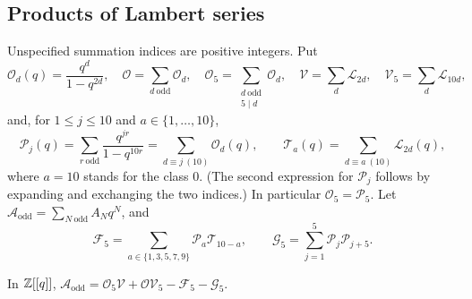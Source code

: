 \subsection{Products of Lambert series}
Unspecified summation indices are positive integers. Put
\[
  \mathcal O_d(q)=\frac{q^d}{1-q^{2d}},\quad
  \mathcal O=\sum_{d\ \mathrm{odd}}\mathcal O_d,\quad
  \mathcal O_5=\sum_{\substack{d\ \mathrm{odd}\\5\mid d}}\mathcal O_d,\quad
  \mathcal V=\sum_{d}\mathcal L_{2d},\quad
  \mathcal V_5=\sum_{d}\mathcal L_{10d},
\]
and, for $1\le j\le10$ and $a\in\{1,\dots,10\}$,
\[
  \mathcal P_j(q)=\sum_{r\ \mathrm{odd}}\frac{q^{jr}}{1-q^{10r}}=\sum_{d\equiv j\ (10)}\mathcal O_d(q),
  \qquad
  \mathcal T_a(q)=\sum_{d\equiv a\ (10)}\mathcal L_{2d}(q),
\]
where $a=10$ stands for the class $0$. (The second expression for $\mathcal P_j$
follows by expanding and exchanging the two indices.) In particular
$\mathcal O_5=\mathcal P_5$. Let $\mathcal A_{\mathrm{odd}}=\sum_{N\ \mathrm{odd}}A_Nq^N$, and
\[
  \mathcal F_5=\sum_{a\in\{1,3,5,7,9\}}\mathcal P_a\mathcal T_{10-a},\qquad
  \mathcal G_5=\sum_{j=1}^5\mathcal P_j\mathcal P_{j+5}.
\]

\begin{proposition}\label{prop:lambert}
In $\mathbb{Z}[[q]]$,
$\mathcal A_{\mathrm{odd}}=\mathcal O_5\mathcal V+\mathcal O\mathcal V_5-\mathcal F_5-\mathcal G_5$.
\end{proposition}

